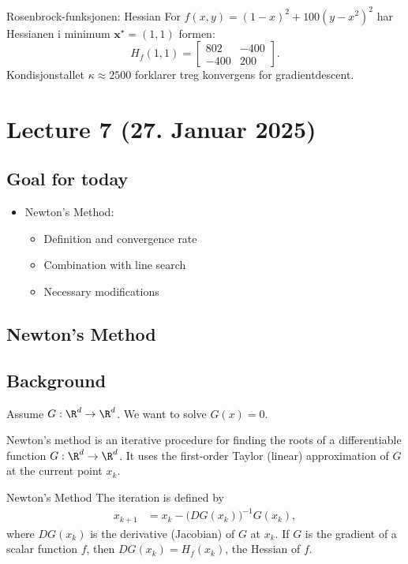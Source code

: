 \begin{example}{Rosenbrock-funksjonen: Hessian}{}
	For \( f(x,y) = (1 - x)^2 + 100(y - x^2)^2 \) har Hessianen i minimum \( \bm{x}^\star = (1,1) \) formen:
	\[
		H_f(1,1) = \begin{bmatrix} 802 & -400 \\ -400 & 200 \end{bmatrix}.
	\]
	Kondisjonstallet \( \kappa \approx 2500 \) forklarer treg konvergens for gradientdescent.
\end{example}

\section{Lecture 7 (27. Januar 2025)}

\subsection*{Goal for today}
\begin{itemize}
	\item Newton's Method:
	      \begin{itemize}
		      \item Definition and convergence rate
		      \item Combination with line search
		      \item Necessary modifications
	      \end{itemize}
\end{itemize}

\subsection*{Newton's Method}

\subsection*{Background}
Assume \(G: \R^d \to \R^d\). We want to solve \(G(x) = 0\).

Newton's method is an iterative procedure for finding the roots of a differentiable function \(G: \R^d \to \R^d\).
It uses the first-order Taylor (linear) approximation of \(G\) at the current point \(x_k\).

\begin{definition}{Newton's Method}{}
	The iteration is defined by
	\begin{align*}
		x_{k+1} & = x_k - \bigl(D G(x_k)\bigr)^{-1} G(x_k),
	\end{align*}
	where \(D G(x_k)\) is the derivative (Jacobian) of \(G\) at \(x_k\). If \(G\) is the gradient of a scalar function \(f\), then \(DG(x_k) = H_f(x_k)\), the Hessian of \(f\).
\end{definition}

